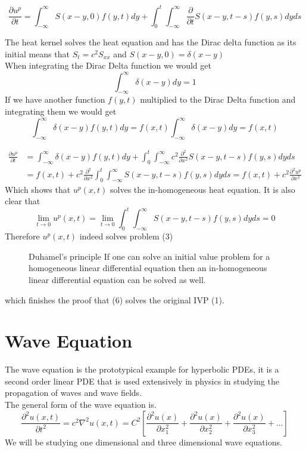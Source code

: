 \documentclass[]{article}
\begin{document}
\[
    \frac{\partial u^p}{\partial t} = \int_{-\infty}^{\infty}S(x-y,0) f(y,t) dy  + \int_{0}^{t}\int_{-\infty}^{\infty}\frac{\partial}{\partial t}S(x-y,t-s) f(y,s)dyds    
\]
\begin{enrichment*}{}
    The heat kernel solves the heat equation and has the Dirac delta function as its initial
    means that $S_t =c^2 S_{xx}$ and $S(x-y,0) = \delta(x-y)$
    \\
    When integrating the Dirac Delta function we would get
    \[
        \int_{-\infty}^{\infty}\delta(x-y) dy = 1
    \]
    If we have another function $f(y,t)$ multiplied to the Dirac Delta function and integrating them we would get
    \[
        \int_{-\infty}^{\infty}\delta(x-y) f(y,t) dy = f(x,t)\int_{-\infty}^{\infty}\delta(x-y) dy = f(x,t) 
    \]
\end{enrichment*}
\begin{align*}
    \frac{\partial u^p}{\partial t} &= \int_{-\infty}^{\infty}\delta(x-y) f(y,t) dy  + \int_{0}^{t}\int_{-\infty}^{\infty}c^2 \frac{\partial^2}{\partial x^2}S(x-y,t-s) f(y,s)dyds
    \\
    &= f(x,t) + c^2 \frac{\partial^2}{\partial x^2} \int_{0}^{t}\int_{-\infty}^{\infty}S(x-y,t-s) f(y,s)dyds
    = f(x,t) + c^2 \frac{\partial^2 u^p}{\partial x^2}
\end{align*}
Which shows that $u^p(x,t)$ solves the in-homogeneous heat equation. It is also clear that
\[
\lim_{t \to 0} u^p(x,t)  = \lim_{t \to 0}\int_{0}^{t} \int_{-\infty}^{\infty}S(x-y,t-s) f(y,s)dyds = 0
\]
Therefore $u^p(x,t)$ indeed solves problem (3)
\begin{figure}[b]
    \begin{enrichment*}{Duhamel's principle}
        If one can solve an initial value problem for a homogeneous linear differential equation then an in-homogeneous linear differential equation can be solved as well.
    \end{enrichment*}    
\end{figure}
which finishes the proof that (6) solves the original IVP (1).

\newpage
\setcounter{equation}{0}
\section{Wave Equation}
The wave equation is the prototypical example for hyperbolic PDEs, it is a second order linear PDE that is used extensively in physics in studying the propagation of waves and wave fields. 
\\
The general form of the wave equation is.
\[
\frac{\partial^2 u(x,t)}{\partial t^2} = c^2\nabla^2 u(x,t) = C^2\left[\frac{\partial^2 u(x)}{\partial x^{2}_{1}} + \frac{\partial^2 u(x)}{\partial x^{2}_{2}} + \frac{\partial^2 u(x)}{\partial x^{2}_{3}} + \dots\right]    
\]
We will be studying one dimensional and three dimensional wave equations.
\setcounter{equation}{0}
\end{document}
